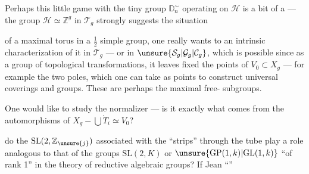 Perhaps this little game with the tiny group $\mathbb D_n^{\sim}$ operating on $\mathcal H$ is a bit of a  --- the group $\mathcal H\simeq\mathbb Z^g$ in $\mathcal T_g$ strongly suggests the situation



of a maximal torus in a $\frac12$ simple group, one really wants to  an intrinsic characterization of it in $\mathcal T_g$ --- or in $\unsure{\mathcal S_g|\mathcal G_g|\mathcal C_g}$, which is possible since  as a group of  topological transformations, it leaves fixed the points of $V_0\subset X_g$ --- for example the two poles, which one can take as  points to construct universal coverings and  groups. These are perhaps the maximal free- subgroups.

One would like to study the normalizer --- is it exactly what comes from the automorphisms of $X_g-\bigcup\mathring{T}_i\simeq V_0$?

do the $\mathrm{SL}(2,\mathbb Z_{\unsure{j}})$ associated with the ``strips'' through the tube  play a role analogous to that of the groups $\mathrm{SL}(2,K)$ or $\unsure{\mathrm{GP}(1,k)|\mathrm{GL}(1,k)}$ ``of rank 1'' in the theory of reductive algebraic groups? If Jean  ``''


